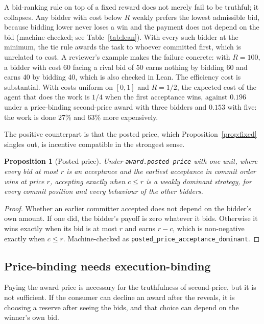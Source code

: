\documentclass[11pt]{article}
\newtheorem{proposition}{Proposition}
\theoremstyle{definition}
\theoremstyle{remark}
\newcommand{\code}[1]{\texttt{#1}}
\begin{document}
A bid-ranking rule on top of a fixed reward does not merely fail to be truthful; it collapses. Any bidder with cost below $R$ weakly prefers the lowest admissible bid, because bidding lower never loses a win and the payment does not depend on the bid (machine-checked; see Table~\ref{tab:lean}). With every such bidder at the minimum, the tie rule awards the task to whoever committed first, which is unrelated to cost. A reviewer's example makes the failure concrete: with $R = 100$, a bidder with cost 60 facing a rival bid of 50 earns nothing by bidding 60 and earns 40 by bidding 40, which is also checked in Lean. The efficiency cost is substantial. With costs uniform on $[0,1]$ and $R = 1/2$, the expected cost of the agent that does the work is $1/4$ when the first acceptance wins, against $0.196$ under a price-binding second-price award with three bidders and $0.153$ with five: the work is done 27\% and 63\% more expensively.

The positive counterpart is that the posted price, which Proposition~\ref{prop:fixed} singles out, is incentive compatible in the strongest sense.

\begin{proposition}[Posted price]
\label{prop:posted}
Under \code{award.posted-price} with one unit, where every bid at most $r$ is an acceptance and the earliest acceptance in commit order wins at price $r$, accepting exactly when $c \le r$ is a weakly dominant strategy, for every commit position and every behaviour of the other bidders.
\end{proposition}

\begin{proof}
Whether an earlier committer accepted does not depend on the bidder's own amount. If one did, the bidder's payoff is zero whatever it bids. Otherwise it wins exactly when its bid is at most $r$ and earns $r - c$, which is non-negative exactly when $c \le r$. Machine-checked as \code{posted\_price\_acceptance\_dominant}.
\end{proof}

\subsection{Price-binding needs execution-binding}
\label{sec:profiles}

Paying the award price is necessary for the truthfulness of second-price, but it is not sufficient. If the consumer can decline an award after the reveals, it is choosing a reserve after seeing the bids, and that choice can depend on the winner's own bid.
\end{document}
